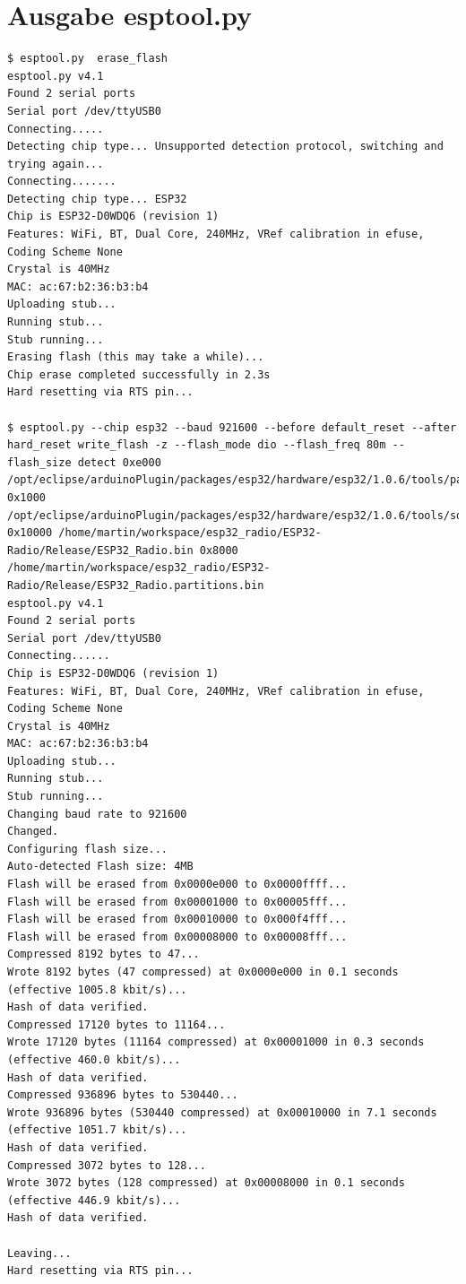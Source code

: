 \documentclass[ngerman,11pt,parskip=half] {scrartcl}
\begin{document}
\appendix

\section{Ausgabe esptool.py}

\begin{lstlisting}
$ esptool.py  erase_flash
esptool.py v4.1
Found 2 serial ports
Serial port /dev/ttyUSB0
Connecting.....
Detecting chip type... Unsupported detection protocol, switching and trying again...
Connecting.......
Detecting chip type... ESP32
Chip is ESP32-D0WDQ6 (revision 1)
Features: WiFi, BT, Dual Core, 240MHz, VRef calibration in efuse, Coding Scheme None
Crystal is 40MHz
MAC: ac:67:b2:36:b3:b4
Uploading stub...
Running stub...
Stub running...
Erasing flash (this may take a while)...
Chip erase completed successfully in 2.3s
Hard resetting via RTS pin...

$ esptool.py --chip esp32 --baud 921600 --before default_reset --after hard_reset write_flash -z --flash_mode dio --flash_freq 80m --flash_size detect 0xe000 /opt/eclipse/arduinoPlugin/packages/esp32/hardware/esp32/1.0.6/tools/partitions/boot_app0.bin 0x1000 /opt/eclipse/arduinoPlugin/packages/esp32/hardware/esp32/1.0.6/tools/sdk/bin/bootloader_dio_80m.bin 0x10000 /home/martin/workspace/esp32_radio/ESP32-Radio/Release/ESP32_Radio.bin 0x8000 /home/martin/workspace/esp32_radio/ESP32-Radio/Release/ESP32_Radio.partitions.bin 
esptool.py v4.1
Found 2 serial ports
Serial port /dev/ttyUSB0
Connecting......
Chip is ESP32-D0WDQ6 (revision 1)
Features: WiFi, BT, Dual Core, 240MHz, VRef calibration in efuse, Coding Scheme None
Crystal is 40MHz
MAC: ac:67:b2:36:b3:b4
Uploading stub...
Running stub...
Stub running...
Changing baud rate to 921600
Changed.
Configuring flash size...
Auto-detected Flash size: 4MB
Flash will be erased from 0x0000e000 to 0x0000ffff...
Flash will be erased from 0x00001000 to 0x00005fff...
Flash will be erased from 0x00010000 to 0x000f4fff...
Flash will be erased from 0x00008000 to 0x00008fff...
Compressed 8192 bytes to 47...
Wrote 8192 bytes (47 compressed) at 0x0000e000 in 0.1 seconds (effective 1005.8 kbit/s)...
Hash of data verified.
Compressed 17120 bytes to 11164...
Wrote 17120 bytes (11164 compressed) at 0x00001000 in 0.3 seconds (effective 460.0 kbit/s)...
Hash of data verified.
Compressed 936896 bytes to 530440...
Wrote 936896 bytes (530440 compressed) at 0x00010000 in 7.1 seconds (effective 1051.7 kbit/s)...
Hash of data verified.
Compressed 3072 bytes to 128...
Wrote 3072 bytes (128 compressed) at 0x00008000 in 0.1 seconds (effective 446.9 kbit/s)...
Hash of data verified.

Leaving...
Hard resetting via RTS pin...
\end{lstlisting}
\end{document}
